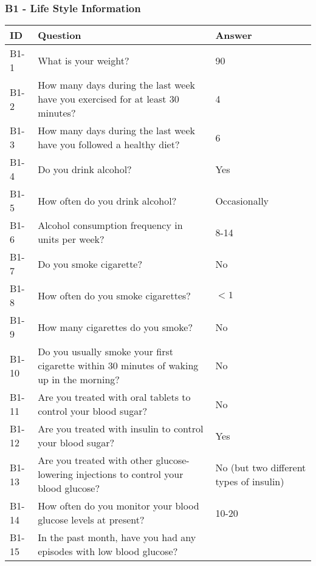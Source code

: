\subsubsection{B1 - Life Style Information}
\begin{table}[H]
    \centering
    \renewcommand{\arraystretch}{1.2}
    \begin{tabularx}{\textwidth}{|l|X|l|}
        \hline
        \textbf{ID} & \textbf{Question} & \textbf{Answer} \\ \hline
        B1-1  & What is your weight? & 
        90   
        \\ \hline
        B1-2  & How many days during the last week have you exercised for at least 30 minutes? & 
        4 
        \\ \hline
        B1-3  & How many days during the last week have you followed a healthy diet? & 
        6  
        \\ \hline
        B1-4  & Do you drink alcohol? & 
        Yes 
        \\ \hline
        B1-5  & How often do you drink alcohol? & 
        Occasionally 
        \\ \hline
        B1-6  & Alcohol consumption frequency in units per week? & 
        8-14
        \\ \hline
        B1-7  & Do you smoke cigarette? & 
        No 
        \\ \hline
        B1-8  & How often do you smoke cigarettes? & 
        $<1$ 
        \\ \hline
        B1-9  & How many cigarettes do you smoke? & 
        No
        \\ \hline
        B1-10 & Do you usually smoke your first cigarette within 30 minutes of waking up in the morning? & 
        No 
        \\ \hline
        B1-11 & Are you treated with oral tablets to control your blood sugar? & 
        No  
        \\ \hline
        B1-12 & Are you treated with insulin to control your blood sugar? & 
        Yes 
        \\ \hline
        B1-13 & Are you treated with other glucose-lowering injections to control your blood glucose? & 
        No (but two different types of insulin) 
        \\ \hline
        B1-14 & How often do you monitor your blood glucose levels at present? & 
        10-20 
        \\ \hline
        B1-15 & In the past month, have you had any episodes with low blood glucose? & 

\end{tabularx}
\end{table}
